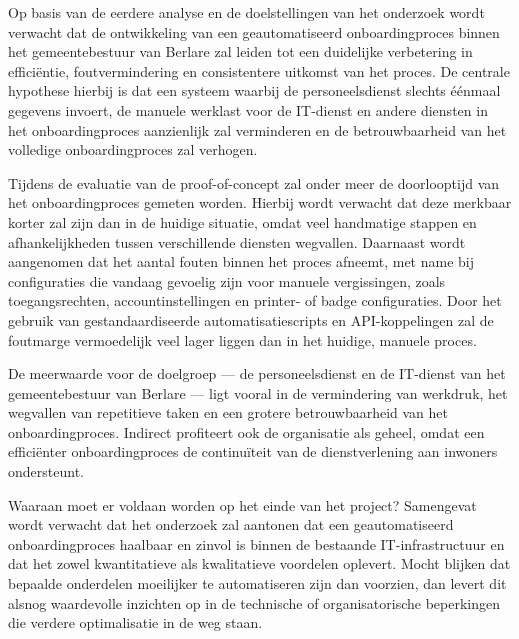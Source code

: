 Op basis van de eerdere analyse en de doelstellingen van het onderzoek wordt verwacht dat de ontwikkeling van een geautomatiseerd onboardingproces binnen het gemeentebestuur van Berlare zal leiden tot een duidelijke verbetering in efficiëntie, foutvermindering en consistentere uitkomst van het proces. De centrale hypothese hierbij is dat een systeem waarbij de personeelsdienst slechts éénmaal gegevens invoert, de manuele werklast voor de IT-dienst en andere diensten in het onboardingproces aanzienlijk zal verminderen en de betrouwbaarheid van het volledige onboardingproces zal verhogen.

Tijdens de evaluatie van de proof-of-concept zal onder meer de doorlooptijd van het onboardingproces gemeten worden. Hierbij wordt verwacht dat deze merkbaar korter zal zijn dan in de huidige situatie, omdat veel handmatige stappen en afhankelijkheden tussen verschillende diensten wegvallen. Daarnaast wordt aangenomen dat het aantal fouten binnen het proces afneemt, met name bij configuraties die vandaag gevoelig zijn voor manuele vergissingen, zoals toegangsrechten, accountinstellingen en printer- of badge configuraties. Door het gebruik van gestandaardiseerde automatisatiescripts en API-koppelingen zal de foutmarge vermoedelijk veel lager liggen dan in het huidige, manuele proces.

De meerwaarde voor de doelgroep — de personeelsdienst en de IT-dienst van het gemeentebestuur van Berlare — ligt vooral in de vermindering van werkdruk, het wegvallen van repetitieve taken en een grotere betrouwbaarheid van het onboardingproces. Indirect profiteert ook de organisatie als geheel, omdat een efficiënter onboardingproces de continuïteit van de dienstverlening aan inwoners ondersteunt.

Waaraan moet er voldaan worden op het einde van het project? Samengevat wordt verwacht dat het onderzoek zal aantonen dat een geautomatiseerd onboardingproces haalbaar en zinvol is binnen de bestaande IT-infrastructuur en dat het zowel kwantitatieve als kwalitatieve voordelen oplevert. Mocht blijken dat bepaalde onderdelen moeilijker te automatiseren zijn dan voorzien, dan levert dit alsnog waardevolle inzichten op in de technische of organisatorische beperkingen die verdere optimalisatie in de weg staan.